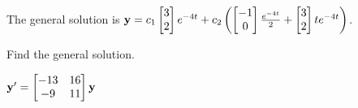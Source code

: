 \documentclass{ximera}
\begin{document}
\begin{problem}
\begin{solution}
The general solution is
${\bf y}= c_1 \begin{bmatrix}3\\2\end{bmatrix}e^{-4t}+
c_2\left( \begin{bmatrix}-1\\0\end{bmatrix}\frac{e^{-4t}}{2}+ \begin{bmatrix}3\\2\end{bmatrix}te^{-4t}\right)$.
\end{solution}
 \end{problem}


 \begin{problem}\label{exer:10.5.7}
 Find the general solution.
 
 $ {\bf
y'}= \begin{bmatrix}-13&16\\-9&11\end{bmatrix}{\bf y}$
 \end{problem}
\end{document}
